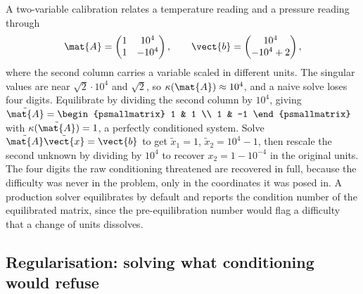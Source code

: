 

\begin{example}
A two-variable calibration relates a temperature reading and a pressure
reading through
\[
\mat{A} = \begin{pmatrix} 1 & 10^{4} \\ 1 & -10^{4} \end{pmatrix},
\qquad \vect{b} = \begin{pmatrix} 10^{4} \\ -10^{4} + 2 \end{pmatrix},
\]
where the second column carries a variable scaled in different units.
The singular values are near $\sqrt{2}\cdot 10^{4}$ and $\sqrt{2}$, so
$\kappa(\mat{A}) \approx 10^{4}$, and a naive solve loses four digits.
Equilibrate by dividing the second column by $10^{4}$, giving
$\tilde{\mat{A}} = \begin{psmallmatrix} 1 & 1 \\ 1 & -1
\end{psmallmatrix}$ with $\kappa(\tilde{\mat{A}}) = 1$, a perfectly
conditioned system. Solve $\tilde{\mat{A}}\tilde{\vect{x}} = \vect{b}$
to get $\tilde{x}_{1} = 1$, $\tilde{x}_{2} = 10^{4} - 1$, then rescale
the second unknown by dividing by $10^{4}$ to recover $x_{2} = 1 -
10^{-4}$ in the original units. The four digits the raw conditioning
threatened are recovered in full, because the difficulty was never in
the problem, only in the coordinates it was posed in. A production
solver equilibrates by default and reports the condition number of the
equilibrated matrix, since the pre-equilibration number would flag a
difficulty that a change of units dissolves.
\end{example}

\subsection{Regularisation: solving what conditioning would refuse}

